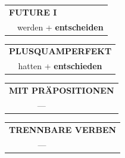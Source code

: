 \documentclass[10pt,a4paper]{revtex4-2}
\begin{document}
\begin{verbbox-acc}
\begin{tabular}{rl}
    \multicolumn{2}{l}{\textbf{FUTURE I} }\\
  &  werden + \textbf{entscheiden}\\
 
  \end{tabular}
\hfill
   \begin{tabular}{rl}
      \multicolumn{2}{l}{\textbf{PLUSQUAMPERFEKT}}\\
  &  hatten + \textbf{entschieden}\\
  \end{tabular}
  
   \vspace{10pt}

\begin{tabular}{lll}
\multicolumn{3}{l}{\textbf{MIT PRÄPOSITIONEN}}\\
& ---\\
\end{tabular}
\hfill
\begin{tabular}{lll}
\multicolumn{3}{l}{\textbf{TRENNBARE VERBEN}}\\
& ---\\
\end{tabular}

  \vspace{-5pt}


\end{verbbox-acc}
\end{document}
